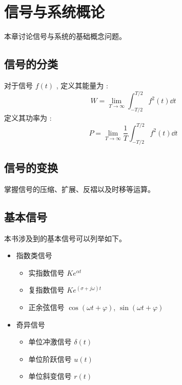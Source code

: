 \documentclass[cn,11pt,chinese,black,simple]{../elegantbook}
\begin{document}
\fi 


\chapter{信号与系统概论}



本章讨论信号与系统的基础概念问题。

\section{信号的分类}

\begin{definition}[能量/功率信号]\label{def:ene-powersig}
  对于信号 \(f(t)\) , 定义其能量为 : 
  \[W = \lim_{T\rightarrow \infty} \int_{-T/2}^{T/2} f^2(t) \dd{t} \]
  定义其功率为 : 
  \[P = \lim_{T\rightarrow \infty} \dfrac{1}{T} \int_{-T/2}^{T/2} f^2(t) \dd{t} \] 
\end{definition}

\section{信号的变换}

掌握信号的压缩、扩展、反褶以及时移等运算。

\section{基本信号}

本书涉及到的基本信号可以列举如下。

\begin{itemize}
  \item 指数类信号 
    \begin{itemize}
      \item 实指数信号 \(K e^{\alpha t}\)
      \item 复指数信号 \(K e^{(\sigma + j \omega)t}\)
      \item 正余弦信号 \(\cos(\omega t + \varphi)\), \(\sin(\omega t + \varphi)\)
    \end{itemize}
  \item 奇异信号
    \begin{itemize}
      \item 单位冲激信号 \(\delta(t)\)
      \item 单位阶跃信号 \(u(t)\)
      \item 单位斜变信号 \(r(t)\)
    \end{itemize}
\end{itemize}
\end{document}
